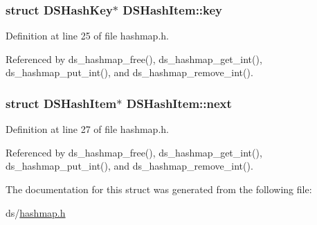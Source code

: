 \subsubsection[{\texorpdfstring{key}{key}}]{\setlength{\rightskip}{0pt plus 5cm}struct {\bf D\+S\+Hash\+Key}$\ast$ D\+S\+Hash\+Item\+::key}\hypertarget{structDSHashItem_ad2459decab1855fa936947d162e4e6bf}{}\label{structDSHashItem_ad2459decab1855fa936947d162e4e6bf}


Definition at line 25 of file hashmap.\+h.



Referenced by ds\+\_\+hashmap\+\_\+free(), ds\+\_\+hashmap\+\_\+get\+\_\+int(), ds\+\_\+hashmap\+\_\+put\+\_\+int(), and ds\+\_\+hashmap\+\_\+remove\+\_\+int().

\subsubsection[{\texorpdfstring{next}{next}}]{\setlength{\rightskip}{0pt plus 5cm}struct {\bf D\+S\+Hash\+Item}$\ast$ D\+S\+Hash\+Item\+::next}\hypertarget{structDSHashItem_a965af2d48aea3abb870419246b3348b1}{}\label{structDSHashItem_a965af2d48aea3abb870419246b3348b1}


Definition at line 27 of file hashmap.\+h.



Referenced by ds\+\_\+hashmap\+\_\+free(), ds\+\_\+hashmap\+\_\+get\+\_\+int(), ds\+\_\+hashmap\+\_\+put\+\_\+int(), and ds\+\_\+hashmap\+\_\+remove\+\_\+int().



The documentation for this struct was generated from the following file\+:\begin{DoxyCompactItemize}
\item 
ds/\hyperlink{hashmap_8h}{hashmap.\+h}\end{DoxyCompactItemize}
